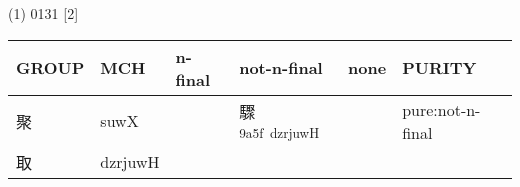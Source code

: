 \documentclass[14pt,a4paper]{scrartcl}
\date{}
\begin{document}
(1) 0131 {[}2{]}

\begin{longtable}[c]{@{}llllll@{}}
\toprule
\begin{minipage}[b]{0.14\columnwidth}\raggedright\strut
GROUP
\strut\end{minipage} &
\begin{minipage}[b]{0.14\columnwidth}\raggedright\strut
MCH
\strut\end{minipage} &
\begin{minipage}[b]{0.14\columnwidth}\raggedright\strut
n-final
\strut\end{minipage} &
\begin{minipage}[b]{0.14\columnwidth}\raggedright\strut
not-n-final
\strut\end{minipage} &
\begin{minipage}[b]{0.14\columnwidth}\raggedright\strut
none
\strut\end{minipage} &
\begin{minipage}[b]{0.14\columnwidth}\raggedright\strut
PURITY
\strut\end{minipage}\tabularnewline
\midrule
\endhead
\begin{minipage}[t]{0.14\columnwidth}\raggedright\strut
聚
\strut\end{minipage} &
\begin{minipage}[t]{0.14\columnwidth}\raggedright\strut
suwX
\strut\end{minipage} &
\begin{minipage}[t]{0.14\columnwidth}\raggedright\strut
\strut\end{minipage} &
\begin{minipage}[t]{0.14\columnwidth}\raggedright\strut
驟\textsuperscript{9a5f~dzrjuwH}
\strut\end{minipage} &
\begin{minipage}[t]{0.14\columnwidth}\raggedright\strut
\strut\end{minipage} &
\begin{minipage}[t]{0.14\columnwidth}\raggedright\strut
pure:not-n-final
\strut\end{minipage}\tabularnewline
\begin{minipage}[t]{0.14\columnwidth}\raggedright\strut
取
\strut\end{minipage} &
\begin{minipage}[t]{0.14\columnwidth}\raggedright\strut
dzrjuwH
\strut\end{minipage} &
\begin{minipage}[t]{0.14\columnwidth}\raggedright\strut

\end{minipage}
\end{longtable}
\end{document}
